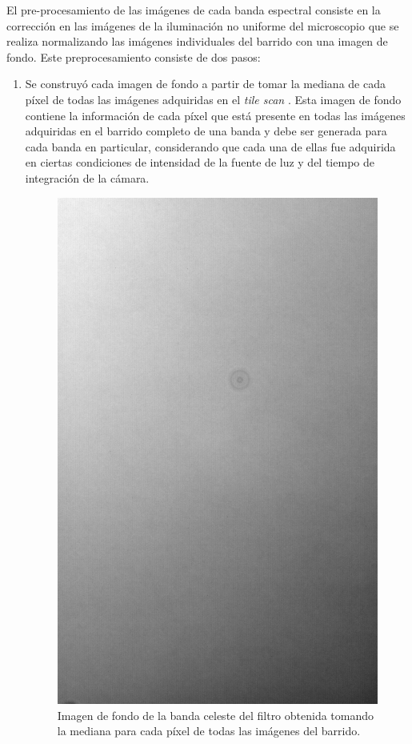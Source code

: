 \documentclass{ctuthesis}
\begin{document}
El pre-procesamiento de las imágenes de cada banda espectral consiste en la corrección en las imágenes de la iluminación no uniforme del microscopio que se realiza normalizando las imágenes individuales del barrido con una imagen de fondo. Este preprocesamiento consiste de dos pasos:
\begin{enumerate}
\item  Se construyó cada imagen de fondo a partir de tomar la mediana de cada píxel de todas las imágenes adquiridas en el \textit{tile scan} \cite{nonuniform}. Esta imagen de fondo contiene la información de cada píxel que está presente en todas las imágenes adquiridas en el barrido completo de una banda y debe ser generada para cada banda en particular, considerando que cada una de ellas fue adquirida en ciertas condiciones de intensidad de la fuente de luz y del tiempo de integración de la cámara. 

\begin{figure}[H]
	\centering
	\includegraphics[scale=0.2]{Figs/defectosZEISS/bg_celeste.png}
	\caption{Imagen de fondo de la banda celeste del filtro obtenida tomando la mediana para cada píxel de todas las imágenes del barrido.}
	\label{fig:bgcel}
\end{figure}


\end{enumerate}
\end{document}
